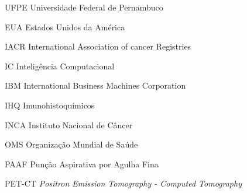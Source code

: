 \listoffigures*
\cleardoublepage

\renewcommand*{\lstlistlistingname}{Lista de Códigos}

\let\oldlstlistoflistings\lstlistoflistings
\renewcommand{\lstlistoflistings}{%
  \begingroup%
  \let\oldnumberline\numberline
  \renewcommand{\numberline}{\lstlistingname~\oldnumberline}%
  \oldlstlistoflistings%
  \endgroup}


\begin{KeepFromToc}
\lstlistoflistings
\end{KeepFromToc}
\cleardoublepage

\listoftables*
\cleardoublepage

\begin{siglas}
  \item[UFPE]   Universidade Federal de Pernambuco
  \item[EUA]    Estados Unidos da América
  \item[IACR]   International Association of cancer Registries
  \item[IC]     Inteligência Computacional
  \item[IBM]     International Business Machines Corporation
  \item[IHQ]    Imunohistoquímicos
  \item[INCA]   Instituto Nacional de Câncer
  \item[OMS]    Organização Mundial de Saúde
  \item[PAAF]   Punção Aspirativa por Agulha Fina
  \item[PET-CT] \emph{Positron Emission Tomography - Computed Tomography}

\end{siglas}

